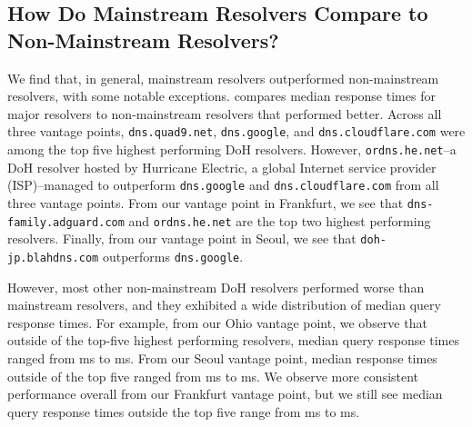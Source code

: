 \subsection{How Do Mainstream Resolvers Compare to Non-Mainstream Resolvers?}
We find that, in general, mainstream resolvers outperformed non-mainstream resolvers, with some notable exceptions.
 compares median response times for major resolvers to non-mainstream resolvers that performed better.
Across all three vantage points, \texttt{dns.quad9.net}, \texttt{dns.google}, and \texttt{dns.cloudflare.com} were among the top five highest performing DoH resolvers.
However, \texttt{ordns.he.net}--a DoH resolver hosted by Hurricane Electric, a global Internet service provider (ISP)--managed to outperform \texttt{dns.google} and \texttt{dns.cloudflare.com} from all three vantage points.
From our vantage point in Frankfurt, we see that \texttt{dns-family.adguard.com} and \texttt{ordns.he.net} are the top two highest performing resolvers.
Finally, from our vantage point in Seoul, we see that \texttt{doh-jp.blahdns.com} outperforms \texttt{dns.google}.

However, most other non-mainstream DoH resolvers performed worse than mainstream resolvers, and they exhibited a wide distribution of median query response times.
For example, from our Ohio vantage point, we observe that outside of the top-five highest performing resolvers, median query response times ranged from  ms to  ms.
From our Seoul vantage point, median response times outside of the top five ranged from  ms to  ms.
We observe more consistent performance overall from our Frankfurt vantage point, but we still see median query response times outside the top five range from  ms to  ms.

